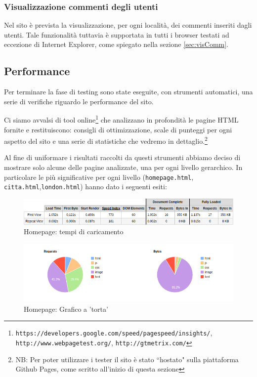\subsubsection{Visualizzazione commenti degli utenti}
Nel sito è prevista la visualizzazione, per ogni località, dei commenti inseriti dagli utenti.
Tale funzionalità tuttavia è supportata in tutti i browser testati ad eccezione di Internet Explorer, come spiegato nella sezione \ref{sec:visComm}.

\subsection{Performance}
Per terminare la fase di testing sono state eseguite, con strumenti
automatici, una serie di verifiche riguardo le performance del sito.

Ci siamo avvalsi di tool online\footnote{\texttt{https://developers.google.com/speed/pagespeed/insights/}, \texttt{http://www.webpagetest.org/},
\texttt{http://gtmetrix.com/}} che analizzano in profondità le pagine HTML
fornite e restituiscono: consigli di ottimizzazione, scale di punteggi per ogni
aspetto del sito e una serie di statistiche che vedremo in dettaglio.\footnote{NB: Per poter utilizzare i tester il sito è stato ``hostato" sulla piattaforma Github Pages, come scritto all'inizio di questa sezione}

Al fine di uniformare i risultati raccolti da questi strumenti abbiamo deciso
di mostrare solo alcune delle pagine analizzate, una per ogni livello
gerarchico.
In particolare le più significative per ogni livello (\texttt{homepage.html},
\texttt{citta.html},\texttt{london.html}) hanno dato i seguenti esiti:

\begin{figure}[h]
\includegraphics[width=\linewidth]{images/performance/webpagetest/home.png}
\caption{Homepage: tempi di caricamento}
\label{fig:tempiHome}
\end{figure}

\begin{figure}[h]
\includegraphics[width=\linewidth]{images/performance/webpagetest/home-graph.png}
\caption{Homepage: Grafico a 'torta'}
\label{fig:tempiOther}
\end{figure}

